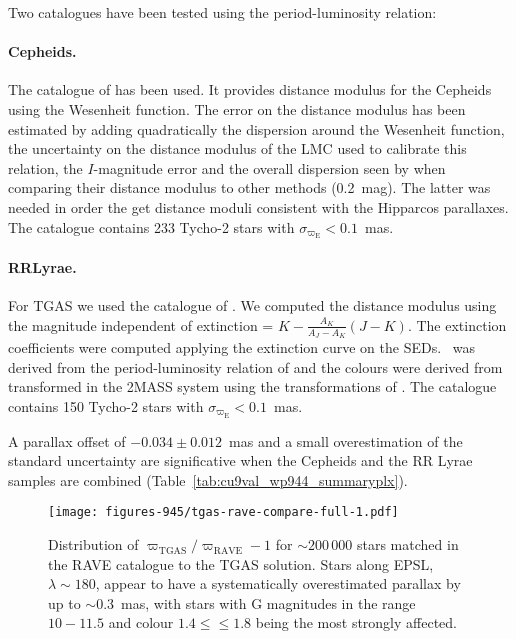 Two catalogues have been tested using the period-luminosity relation: 

\paragraph{Cepheids.} The catalogue of  \cite{2012ApJ...747...50N} has been used. It provides distance modulus for the Cepheids using the Wesenheit function. The error on the distance modulus has been estimated by adding quadratically the dispersion around the Wesenheit function, the uncertainty on the distance modulus of the LMC used to calibrate this relation, the $I$-magnitude error and the overall dispersion seen by \citet{2012ApJ...747...50N} when comparing their distance modulus to other methods (0.2~mag). The latter was needed in order the get distance moduli consistent with the Hipparcos parallaxes. 
  The catalogue contains 233 Tycho-2 stars with $\sigma_{\varpi_\mathrm{E}}<0.1$~mas. 
  
\paragraph{RRLyrae.} For TGAS we used the catalogue of \cite{2005A&A...442..381M}. We computed the distance modulus using the magnitude independent of extinction \Kjk = $K - \frac{A_K}{A_J - A_K} (J-K)$. The extinction coefficients were computed applying the \cite{FitzpatrickMassa07} extinction curve on the \citet{CastelliKurucz03} SEDs. \MK\ was derived from the period-luminosity relation of \cite{2015ApJ...807..127M}  and the colours were derived from \cite{2004ApJS..154..633C} transformed in the 2MASS system using the transformations of \cite{2001AJ....121.2851C}. The catalogue contains 150 Tycho-2 stars with $\sigma_{\varpi_\mathrm{E}}<0.1$~mas.
  
A parallax offset of $-0.034 \pm 0.012$~mas and a small overestimation of the standard uncertainty are significative when the Cepheids and the RR Lyrae samples are combined (Table~\ref{tab:cu9val_wp944_summaryplx}). \\

\begin{figure}
\begin{center}
\texttt{[image: figures-945/tgas-rave-compare-full-1.pdf]}
\caption{Distribution of $\varpi_\mathrm{TGAS}/\varpi_\mathrm{RAVE} - 1$ for $\sim 200\,000$ stars matched in the
RAVE catalogue to the TGAS solution. Stars along EPSL, $\lambda \sim 180${\deg}, 
appear to have a systematically overestimated parallax by
up to $\sim 0.3$~mas, with stars with G magnitudes in the range $10 - 11.5$
and colour $1.4 \le ${\bprp}$ \le 1.8$ being the most strongly affected.}
\label{fig:rave2tgas-wp945}
\end{center}
\end{figure}

